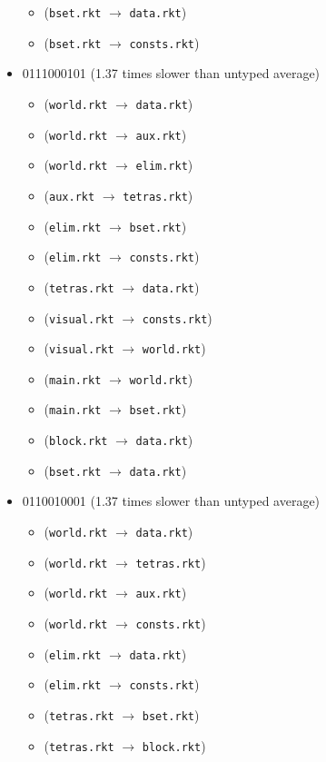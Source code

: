 \documentclass{article}
\newcommand{\mono}[1]{\texttt{#1}}
\begin{document}
\begin{itemize}
\begin{itemize}
  \item (\mono{bset.rkt} $\rightarrow$ \mono{data.rkt})
  \item (\mono{bset.rkt} $\rightarrow$ \mono{consts.rkt})
  \end{itemize}
\item 0111000101 (1.37 times slower than untyped average)
  \begin{itemize}
  \item (\mono{world.rkt} $\rightarrow$ \mono{data.rkt})
  \item (\mono{world.rkt} $\rightarrow$ \mono{aux.rkt})
  \item (\mono{world.rkt} $\rightarrow$ \mono{elim.rkt})
  \item (\mono{aux.rkt} $\rightarrow$ \mono{tetras.rkt})
  \item (\mono{elim.rkt} $\rightarrow$ \mono{bset.rkt})
  \item (\mono{elim.rkt} $\rightarrow$ \mono{consts.rkt})
  \item (\mono{tetras.rkt} $\rightarrow$ \mono{data.rkt})
  \item (\mono{visual.rkt} $\rightarrow$ \mono{consts.rkt})
  \item (\mono{visual.rkt} $\rightarrow$ \mono{world.rkt})
  \item (\mono{main.rkt} $\rightarrow$ \mono{world.rkt})
  \item (\mono{main.rkt} $\rightarrow$ \mono{bset.rkt})
  \item (\mono{block.rkt} $\rightarrow$ \mono{data.rkt})
  \item (\mono{bset.rkt} $\rightarrow$ \mono{data.rkt})
  \end{itemize}
\item 0110010001 (1.37 times slower than untyped average)
  \begin{itemize}
  \item (\mono{world.rkt} $\rightarrow$ \mono{data.rkt})
  \item (\mono{world.rkt} $\rightarrow$ \mono{tetras.rkt})
  \item (\mono{world.rkt} $\rightarrow$ \mono{aux.rkt})
  \item (\mono{world.rkt} $\rightarrow$ \mono{consts.rkt})
  \item (\mono{elim.rkt} $\rightarrow$ \mono{data.rkt})
  \item (\mono{elim.rkt} $\rightarrow$ \mono{consts.rkt})
  \item (\mono{tetras.rkt} $\rightarrow$ \mono{bset.rkt})
  \item (\mono{tetras.rkt} $\rightarrow$ \mono{block.rkt})

\end{itemize}
\end{itemize}
\end{document}
